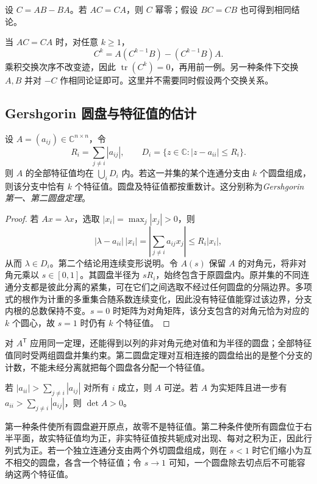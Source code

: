 \begin{example}
\label{ex:xie-ex-eig-commutator-nilpotent}
设 $C=AB-BA$。若 $AC=CA$，则 $C$ 幂零；假设 $BC=CB$ 也可得到相同结论。
\end{example}
\begin{solve}
当 $AC=CA$ 时，对任意 $k\ge1$，
\[
C^k=A(C^{k-1}B)-(C^{k-1}B)A.
\]
乘积交换次序不改变迹，因此 $\operatorname{tr}(C^k)=0$，再用前一例。另一种条件下交换 $A,B$ 并对 $-C$ 作相同论证即可。这里并不需要同时假设两个交换关系。
\end{solve}

\subsection{Gershgorin 圆盘与特征值的估计}
\label{subsec:xie-ex-eig-gershgorin}

\begin{theorem}
\label{thm:xie-ex-eig-gershgorin}
设 $A=(a_{ij})\in\mathbb C^{n\times n}$，令
\[
R_i=\sum_{j\ne i}|a_{ij}|,\qquad
D_i=\{z\in\mathbb C:|z-a_{ii}|\le R_i\}.
\]
则 $A$ 的全部特征值均在 $\bigcup_iD_i$ 内。若这一并集的某个连通分支由 $k$ 个圆盘组成，则该分支中恰有 $k$ 个特征值。圆盘及特征值都按重数计。这分别称为\emph{Gershgorin 第一、第二圆盘定理}。
\end{theorem}
\begin{proof}
若 $Ax=\lambda x$，选取 $|x_i|=\max_j|x_j|>0$，则
\[
|\lambda-a_{ii}|\,|x_i|
=\left|\sum_{j\ne i}a_{ij}x_j\right|
\le R_i|x_i|,
\]
从而 $\lambda\in D_i$。第二个结论用连续变形说明。令 $A(s)$ 保留 $A$ 的对角元，将非对角元乘以 $s\in[0,1]$。其圆盘半径为 $sR_i$，始终包含于原圆盘内。原并集的不同连通分支都是彼此分离的紧集，可在它们之间选取不经过任何圆盘的分隔边界。多项式的根作为计重的多重集合随系数连续变化，因此没有特征值能穿过该边界，分支内根的总数保持不变。$s=0$ 时矩阵为对角矩阵，该分支包含的对角元恰为对应的 $k$ 个圆心，故 $s=1$ 时仍有 $k$ 个特征值。
\end{proof}

对 $A^{\mathsf T}$ 应用同一定理，还能得到以列的非对角元绝对值和为半径的圆盘；全部特征值同时受两组圆盘并集约束。第二圆盘定理对互相连接的圆盘给出的是整个分支的计数，不能未经分离就把每个圆盘各分配一个特征值。

\begin{example}
若 $|a_{ii}|>\sum_{j\ne i}|a_{ij}|$ 对所有 $i$ 成立，则 $A$ 可逆。若 $A$ 为实矩阵且进一步有 $a_{ii}>\sum_{j\ne i}|a_{ij}|$，则 $\det A>0$。
\end{example}
\begin{solve}
第一种条件使所有圆盘避开原点，故零不是特征值。第二种条件使所有圆盘位于右半平面，故实特征值均为正，非实特征值按共轭成对出现、每对之积为正，因此行列式为正。若一个独立连通分支由两个外切圆盘组成，则在 $s<1$ 时它们缩小为互不相交的圆盘，各含一个特征值；令 $s\to1$ 可知，一个圆盘除去切点后不可能容纳这两个特征值。
\end{solve}

